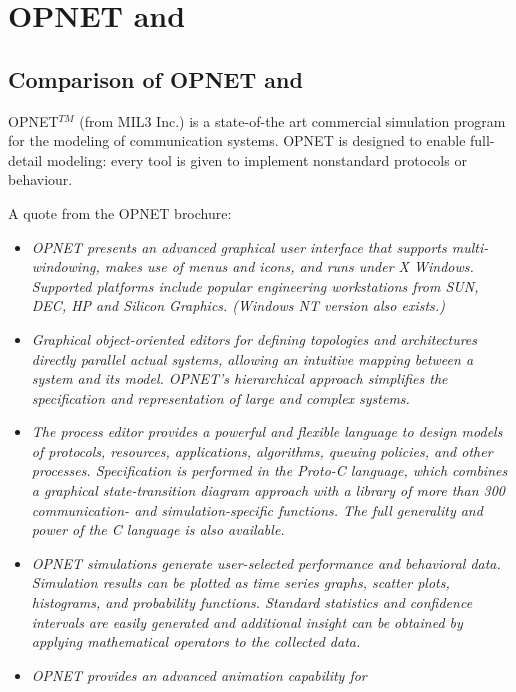 \chapter{OPNET and {\opp}}
\label{cha:opnet-and-omnet}

\section{Comparison of OPNET and {\opp}}

OPNET$^{TM}$ (from MIL3 Inc.) is a state-of-the art commercial simulation 
program for the modeling of communication systems. OPNET is designed 
to enable full-detail modeling: every tool is given to implement 
nonstandard protocols or behaviour.


A quote from the OPNET brochure:


\begin{itemize}
\item{\textit{OPNET presents an advanced graphical user 
interface that supports multi-windowing, makes use of menus and 
icons, and runs under X Windows. Supported platforms include 
popular engineering workstations from SUN, DEC, HP and Silicon 
Graphics. (Windows NT version also exists.)}}
\item{\textit{Graphical object-oriented editors for defining topologies 
and architectures directly parallel actual systems, allowing 
an intuitive mapping between a system and its model. OPNET's 
hierarchical approach simplifies the specification and representation 
of large and complex systems.}}
\item{\textit{The process editor provides a powerful and flexible 
language to design models of protocols, resources, applications, 
algorithms, queuing policies, and other processes. Specification 
is performed in the Proto-C language, which combines a graphical 
state-transition diagram approach with a library of more than 
300 communication- and simulation-specific functions. The full 
generality and power of the C language is also available.}}
\item{\textit{OPNET simulations generate user-selected performance 
and behavioral data. Simulation results can be plotted as time 
series graphs, scatter plots, histograms, and probability functions. 
Standard statistics and confidence intervals are easily generated 
and additional insight can be obtained by applying mathematical 
operators to the collected data. }}
\item{\textit{OPNET provides an advanced animation capability for 
}}
\end{itemize}

